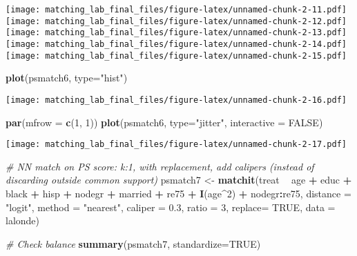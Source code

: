 \documentclass[]{article}
\newenvironment{Shaded}{\begin{snugshade}}{\end{snugshade}}
\newcommand{\CommentTok}[1]{\textcolor[rgb]{0.56,0.35,0.01}{\textit{#1}}}
\newcommand{\DataTypeTok}[1]{\textcolor[rgb]{0.13,0.29,0.53}{#1}}
\newcommand{\DecValTok}[1]{\textcolor[rgb]{0.00,0.00,0.81}{#1}}
\newcommand{\FloatTok}[1]{\textcolor[rgb]{0.00,0.00,0.81}{#1}}
\newcommand{\KeywordTok}[1]{\textcolor[rgb]{0.13,0.29,0.53}{\textbf{#1}}}
\newcommand{\NormalTok}[1]{#1}
\newcommand{\OperatorTok}[1]{\textcolor[rgb]{0.81,0.36,0.00}{\textbf{#1}}}
\newcommand{\OtherTok}[1]{\textcolor[rgb]{0.56,0.35,0.01}{#1}}
\newcommand{\StringTok}[1]{\textcolor[rgb]{0.31,0.60,0.02}{#1}}
\begin{document}
\texttt{[image: matching\_lab\_final\_files/figure-latex/unnamed-chunk-2-11.pdf]}
\texttt{[image: matching\_lab\_final\_files/figure-latex/unnamed-chunk-2-12.pdf]}
\texttt{[image: matching\_lab\_final\_files/figure-latex/unnamed-chunk-2-13.pdf]}
\texttt{[image: matching\_lab\_final\_files/figure-latex/unnamed-chunk-2-14.pdf]}
\texttt{[image: matching\_lab\_final\_files/figure-latex/unnamed-chunk-2-15.pdf]}

\begin{Shaded}
\begin{Highlighting}[]
\KeywordTok{plot}\NormalTok{(psmatch6, }\DataTypeTok{type=}\StringTok{"hist"}\NormalTok{)}
\end{Highlighting}
\end{Shaded}

\texttt{[image: matching\_lab\_final\_files/figure-latex/unnamed-chunk-2-16.pdf]}

\begin{Shaded}
\begin{Highlighting}[]
\KeywordTok{par}\NormalTok{(}\DataTypeTok{mfrow =} \KeywordTok{c}\NormalTok{(}\DecValTok{1}\NormalTok{, }\DecValTok{1}\NormalTok{))}
\KeywordTok{plot}\NormalTok{(psmatch6, }\DataTypeTok{type=}\StringTok{"jitter"}\NormalTok{, }\DataTypeTok{interactive =} \OtherTok{FALSE}\NormalTok{)}
\end{Highlighting}
\end{Shaded}

\texttt{[image: matching\_lab\_final\_files/figure-latex/unnamed-chunk-2-17.pdf]}

\begin{Shaded}
\begin{Highlighting}[]
\CommentTok{# NN match on PS score: k:1, with replacement, add calipers (instead of discarding outside common support)}
\NormalTok{psmatch7 <-}\StringTok{ }\KeywordTok{matchit}\NormalTok{(treat }\OperatorTok{~}\StringTok{ }\NormalTok{age }\OperatorTok{+}\StringTok{ }\NormalTok{educ }\OperatorTok{+}\StringTok{ }\NormalTok{black }\OperatorTok{+}\StringTok{ }\NormalTok{hisp }\OperatorTok{+}\StringTok{ }\NormalTok{nodegr }\OperatorTok{+}\StringTok{ }\NormalTok{married }\OperatorTok{+}\StringTok{ }\NormalTok{re75 }\OperatorTok{+}\StringTok{ }
\StringTok{                      }\KeywordTok{I}\NormalTok{(age}\OperatorTok{^}\DecValTok{2}\NormalTok{) }\OperatorTok{+}\StringTok{ }\NormalTok{nodegr}\OperatorTok{:}\NormalTok{re75, }
                    \DataTypeTok{distance =} \StringTok{"logit"}\NormalTok{, }\DataTypeTok{method =} \StringTok{"nearest"}\NormalTok{, }\DataTypeTok{caliper =} \FloatTok{0.3}\NormalTok{, }
                    \DataTypeTok{ratio =} \DecValTok{3}\NormalTok{, }\DataTypeTok{replace=} \OtherTok{TRUE}\NormalTok{, }\DataTypeTok{data =}\NormalTok{ lalonde)}

\CommentTok{# Check balance}
\KeywordTok{summary}\NormalTok{(psmatch7, }\DataTypeTok{standardize=}\OtherTok{TRUE}\NormalTok{)}
\end{Highlighting}
\end{Shaded}
\end{document}
